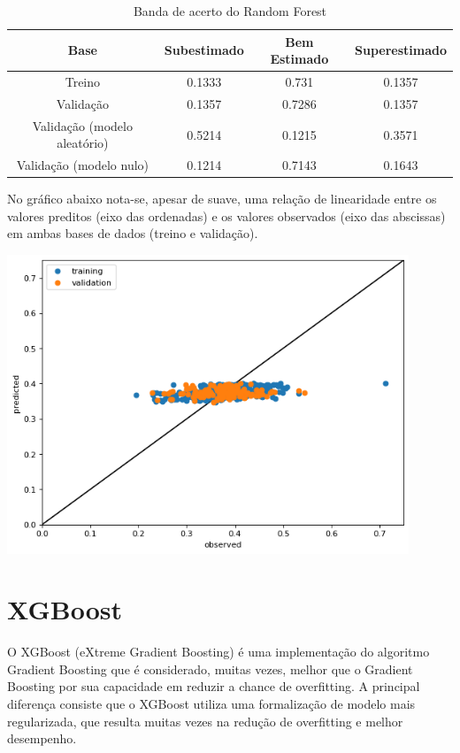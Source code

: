 \begin{table}[h]
\centering
\caption{Banda de acerto do Random Forest}
\label{tab:cap3_band_random_forest}
\begin{tabular}{cccc}
Base & Subestimado & Bem Estimado & Superestimado \\
\hline
Treino & 0.1333 & 0.731 & 0.1357 \\
Validação & 0.1357 & 0.7286 & 0.1357 \\
Validação (modelo aleatório) & 0.5214 & 0.1215 & 0.3571 \\
Validação (modelo nulo) & 0.1214 & 0.7143 & 0.1643 \\
\hline
\end{tabular}
\end{table}
\FloatBarrier

No gráfico abaixo nota-se, apesar de suave, uma relação de linearidade entre os valores preditos (eixo das ordenadas) e os valores observados (eixo das abscissas) em ambas bases de dados (treino e validação).

\graphicspath{ {./figuras/model_performance/} }
\includegraphics[width=12.0cm, keepaspectratio]{cap3_scatter_random_forest}
\label{ape:cap3_scatter_random_forest}

\section{XGBoost}
\label{sec:xgboost}

O XGBoost (eXtreme Gradient Boosting) é uma implementação do algoritmo Gradient Boosting que é considerado, muitas vezes, melhor que o Gradient Boosting por sua capacidade em reduzir a chance de overfitting. A principal diferença consiste que o XGBoost utiliza uma formalização de modelo mais regularizada, que resulta muitas vezes na redução de overfitting e melhor desempenho.

